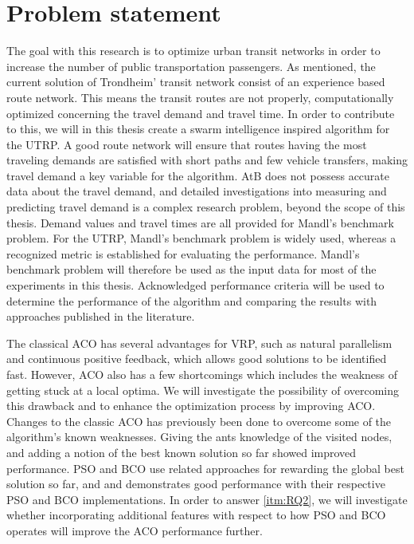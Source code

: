 \section{Problem statement}
\label{subsec:problemStatement}

The goal with this research is to optimize urban transit networks in order to increase the number of public transportation passengers. As mentioned, the current solution of Trondheim' transit network consist of an experience based route network. This means the transit routes are not properly, computationally optimized concerning the travel demand and travel time. In order to contribute to this, we will in this thesis create a swarm intelligence inspired algorithm for the UTRP. A good route network will ensure that routes having the most traveling demands are satisfied with short paths and few vehicle transfers, making travel demand a key variable for the algorithm. AtB\citep{website:atb} does not possess accurate data about the travel demand, and detailed investigations into measuring and predicting travel demand is a complex research problem, beyond the scope of this thesis. Demand values and travel times are all provided for Mandl's benchmark problem\citep{mandl79}. For the UTRP, Mandl's benchmark problem is widely used, whereas a recognized metric is established for evaluating the performance. Mandl's benchmark problem will therefore be used as the input data for most of the experiments in this thesis. Acknowledged performance criteria will be used to determine the performance of the algorithm and comparing the results with approaches published in the literature\citep{nikolic14,kechagiopoulos14,mandl79,kidwai98, fan10, chakroborty02, zhang10, chew12}.

The classical ACO has several advantages for VRP, such as natural parallelism and continuous positive feedback, which allows good solutions to be identified fast. However, ACO also has a few shortcomings which includes the weakness of getting stuck at a local optima. We will investigate the possibility of overcoming this drawback and to enhance the optimization process by improving ACO. Changes to the classic ACO has previously been done to overcome some of the algorithm's known weaknesses. Giving the ants knowledge of the visited nodes\citep{sedighpour14,salehinejad10,poorzahedy11}, and adding a notion of the best known solution so far\citep{tripathi09,sedighpour14} showed improved performance. PSO and BCO use related approaches for rewarding the global best solution so far, and \citet{kechagiopoulos14} and \citet{nikolic14} demonstrates good performance with their respective PSO and BCO implementations. In order to answer \vref{itm:RQ2}, we will investigate whether incorporating additional features with respect to how PSO and BCO operates will improve the ACO performance further.


